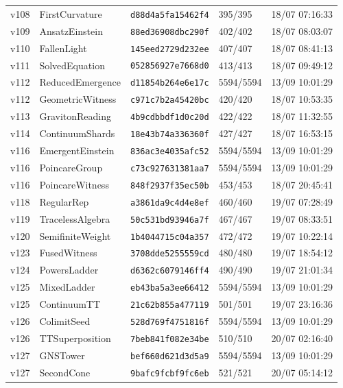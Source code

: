 \documentclass[11pt]{article}
\theoremstyle{definition}\newtheorem{deriv}{Derivação}
\begin{document}
{\begin{longtable}{@{}lllll@{}}
v108 & FirstCurvature & \texttt{d88d4a5fa15462f4} & 395/395 & 18/07 07:16:33 \\
v109 & AnsatzEinstein & \texttt{88ed36908dbc290f} & 402/402 & 18/07 08:03:07 \\
v110 & FallenLight & \texttt{145eed2729d232ee} & 407/407 & 18/07 08:41:13 \\
v111 & SolvedEquation & \texttt{052856927e7668d0} & 413/413 & 18/07 09:49:12 \\
v112 & ReducedEmergence & \texttt{d11854b264e6e17c} & 5594/5594 & 13/09 10:01:29 \\
v112 & GeometricWitness & \texttt{c971c7b2a45420bc} & 420/420 & 18/07 10:53:35 \\
v113 & GravitonReading & \texttt{4b9cdbbdf1d0c20d} & 422/422 & 18/07 11:32:55 \\
v114 & ContinuumShards & \texttt{18e43b74a336360f} & 427/427 & 18/07 16:53:15 \\
v116 & EmergentEinstein & \texttt{836ac3e4035afc52} & 5594/5594 & 13/09 10:01:29 \\
v116 & PoincareGroup & \texttt{c73c927631381aa7} & 5594/5594 & 13/09 10:01:29 \\
v116 & PoincareWitness & \texttt{848f2937f35ec50b} & 453/453 & 18/07 20:45:41 \\
v118 & RegularRep & \texttt{a3861da9c4d4e8ef} & 460/460 & 19/07 07:28:49 \\
v119 & TracelessAlgebra & \texttt{50c531bd93946a7f} & 467/467 & 19/07 08:33:51 \\
v120 & SemifiniteWeight & \texttt{1b4044715c04a357} & 472/472 & 19/07 10:22:14 \\
v123 & FusedWitness & \texttt{3708dde5255559cd} & 480/480 & 19/07 18:54:12 \\
v124 & PowersLadder & \texttt{d6362c6079146ff4} & 490/490 & 19/07 21:01:34 \\
v125 & MixedLadder & \texttt{eb43ba5a3ee66412} & 5594/5594 & 13/09 10:01:29 \\
v125 & ContinuumTT & \texttt{21c62b855a477119} & 501/501 & 19/07 23:16:36 \\
v126 & ColimitSeed & \texttt{528d769f4751816f} & 5594/5594 & 13/09 10:01:29 \\
v126 & TTSuperposition & \texttt{7beb841f082e34be} & 510/510 & 20/07 02:16:40 \\
v127 & GNSTower & \texttt{bef660d621d3d5a9} & 5594/5594 & 13/09 10:01:29 \\
v127 & SecondCone & \texttt{9bafc9fcbf9fc6eb} & 521/521 & 20/07 05:14:12 \\

\end{longtable}}
\end{document}
